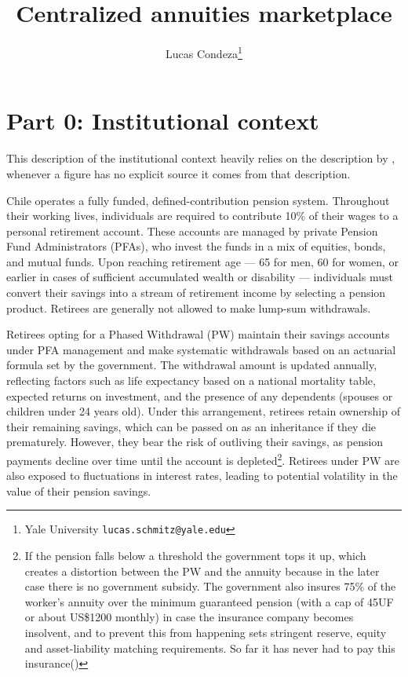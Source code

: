 \documentclass[12pt]{article}
\theoremstyle{plain}
\theoremstyle{plain}
\begin{document}
 

\newpage
 \title{{\Large Centralized annuities marketplace}}
\author{Lucas Condeza\thanks{Yale University \texttt{lucas.schmitz@yale.edu}}} 
\date{}
\maketitle



\section{Part 0: Institutional context}

This description of the institutional context heavily relies on the description by \textcite{boehm_intermediation_2024}, whenever a figure has no explicit source it comes from that description. 


Chile operates a fully funded, defined-contribution pension system. Throughout their working lives, individuals are required to contribute 10\% of their wages to a personal retirement account. These accounts are managed by private Pension Fund Administrators (PFAs), who invest the funds in a mix of equities, bonds, and mutual funds. Upon reaching retirement age — 65 for men, 60 for women, or earlier in cases of sufficient accumulated wealth or disability — individuals must convert their savings into a stream of retirement income by selecting a pension product. Retirees are generally not allowed to make lump-sum withdrawals.


Retirees opting for a Phased Withdrawal (PW) maintain their savings accounts under PFA management and make systematic withdrawals based on an actuarial formula set by the government. The withdrawal amount is updated annually, reflecting factors such as life expectancy based on a national mortality table, expected returns on investment, and the presence of any dependents (spouses or children under 24 years old). Under this arrangement, retirees retain ownership of their remaining savings, which can be passed on as an inheritance if they die prematurely. However, they bear the risk of outliving their savings, as pension payments decline over time until the account is depleted\footnote{If the pension falls below a threshold the government tops it up, which creates a distortion between the PW and the annuity because in the later case there is no government subsidy. The government also insures 75\% of the worker’s annuity over the minimum guaranteed pension (with a cap of 45UF or about US\$1200 monthly) in case the insurance company becomes insolvent, and to prevent this from happening sets stringent reserve, equity and asset-liability matching requirements. So far it has never had to pay this insurance(\cite{james_pensiones_2005})}. Retirees under PW are also exposed to fluctuations in interest rates, leading to potential volatility in the value of their pension savings.
\end{document}
